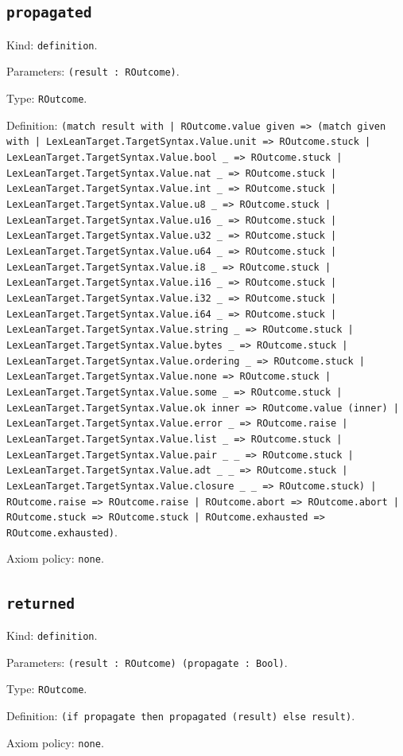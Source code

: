 \documentclass[11pt]{article}
\begin{document}
\subsection*{\texttt{propagated}}
\noindent Kind: \texttt{definition}.\par
\noindent Parameters: \texttt{(result : ROutcome)}.\par
\noindent Type: \texttt{ROutcome}.\par
\noindent Definition: \texttt{(match result with | ROutcome.value given => (match given with | LexLeanTarget.TargetSyntax.Value.unit => ROutcome.stuck | LexLeanTarget.TargetSyntax.Value.bool \_ => ROutcome.stuck | LexLeanTarget.TargetSyntax.Value.nat \_ => ROutcome.stuck | LexLeanTarget.TargetSyntax.Value.int \_ => ROutcome.stuck | LexLeanTarget.TargetSyntax.Value.u8 \_ => ROutcome.stuck | LexLeanTarget.TargetSyntax.Value.u16 \_ => ROutcome.stuck | LexLeanTarget.TargetSyntax.Value.u32 \_ => ROutcome.stuck | LexLeanTarget.TargetSyntax.Value.u64 \_ => ROutcome.stuck | LexLeanTarget.TargetSyntax.Value.i8 \_ => ROutcome.stuck | LexLeanTarget.TargetSyntax.Value.i16 \_ => ROutcome.stuck | LexLeanTarget.TargetSyntax.Value.i32 \_ => ROutcome.stuck | LexLeanTarget.TargetSyntax.Value.i64 \_ => ROutcome.stuck | LexLeanTarget.TargetSyntax.Value.string \_ => ROutcome.stuck | LexLeanTarget.TargetSyntax.Value.bytes \_ => ROutcome.stuck | LexLeanTarget.TargetSyntax.Value.ordering \_ => ROutcome.stuck | LexLeanTarget.TargetSyntax.Value.none => ROutcome.stuck | LexLeanTarget.TargetSyntax.Value.some \_ => ROutcome.stuck | LexLeanTarget.TargetSyntax.Value.ok inner => ROutcome.value (inner) | LexLeanTarget.TargetSyntax.Value.error \_ => ROutcome.raise | LexLeanTarget.TargetSyntax.Value.list \_ => ROutcome.stuck | LexLeanTarget.TargetSyntax.Value.pair \_ \_ => ROutcome.stuck | LexLeanTarget.TargetSyntax.Value.adt \_ \_ => ROutcome.stuck | LexLeanTarget.TargetSyntax.Value.closure \_ \_ => ROutcome.stuck) | ROutcome.raise => ROutcome.raise | ROutcome.abort => ROutcome.abort | ROutcome.stuck => ROutcome.stuck | ROutcome.exhausted => ROutcome.exhausted)}.\par
\noindent Axiom policy: \texttt{none}.\par
\subsection*{\texttt{returned}}
\noindent Kind: \texttt{definition}.\par
\noindent Parameters: \texttt{(result : ROutcome) (propagate : Bool)}.\par
\noindent Type: \texttt{ROutcome}.\par
\noindent Definition: \texttt{(if propagate then propagated (result) else result)}.\par
\noindent Axiom policy: \texttt{none}.\par
\end{document}
